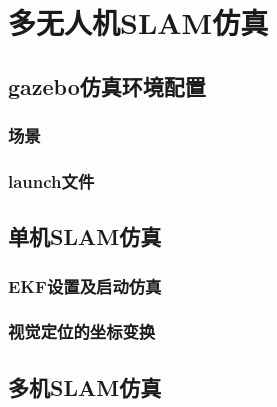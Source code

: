 \chapter{多无人机SLAM仿真} \label{Simulation}

\section{gazebo仿真环境配置}

\subsection{场景} \label{4.1.1}
\subsection{launch文件} \label{4.1.2}

\section{单机SLAM仿真}
\subsection{EKF设置及启动仿真} \label{4.2.1}
\subsection{视觉定位的坐标变换} \label{4.2.2}

\section{多机SLAM仿真}
